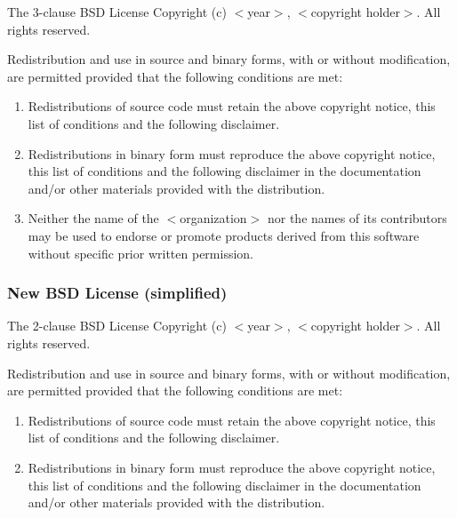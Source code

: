 \begin{frame}

\begin{block}{The 3-clause BSD License}
Copyright (c) $<$year$>$, $<$copyright holder$>$. All rights reserved.

Redistribution and use in source and binary forms, with or without
modification, are permitted provided that the following conditions are met:

\small

\begin{enumerate}
\item Redistributions of source code must retain the above copyright
      notice, this list of conditions and the following disclaimer.
\item Redistributions in binary form must reproduce the above copyright
      notice, this list of conditions and the following disclaimer in the
      documentation and/or other materials provided with the distribution.
\item Neither the name of the $<$organization$>$ nor the
      names of its contributors may be used to endorse or promote products
      derived from this software without specific prior written permission.
\end{enumerate}
 
\end{block}

\end{frame}


\begin{frame}
\frametitle{New BSD License (simplified)}

\begin{block}{The 2-clause BSD License} 
Copyright (c) $<$year$>$, $<$copyright holder$>$. All rights reserved.

Redistribution and use in source and binary forms, with or without
modification, are permitted provided that the following conditions
are met:

\begin{enumerate}
\item Redistributions of source code must retain the above copyright notice, this list of  conditions and the following disclaimer.
\item Redistributions in binary form must reproduce the above copyright notice, this list of conditions and the following disclaimer in the documentation and/or other materials provided with the distribution.
\end{enumerate}
 
\end{block}

\end{frame}

